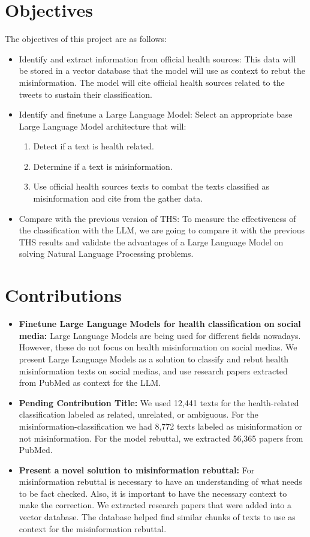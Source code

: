 \section{Objectives}

\noindent
The objectives of this project are as follows:
\begin{itemize}
	\item Identify and extract information from official health sources: This data will be stored in a vector database that the model will use as context to rebut the misinformation. The model will cite official health sources related to the tweets to sustain their classification.
	\item Identify and finetune a Large Language Model: Select an appropriate base Large Language Model architecture that will:
	\begin{enumerate}
		\item Detect if a text is health related.
		\item Determine if a text is misinformation.
		\item Use official health sources texts to combat the texts classified as misinformation and cite from the gather data.
	\end{enumerate}
	\item Compare with the previous version of THS: To measure the effectiveness of the classification with the LLM, we are going to compare it with the previous THS results and validate the advantages of a Large Language Model on solving Natural Language Processing problems. 
\end{itemize}

\section{Contributions}
\noindent
\begin{itemize}
	\item \textbf{Finetune Large Language Models for health classification on social media:} Large Language Models are being used for different fields nowadays. However, these do not focus on health misinformation on social medias. We present Large Language Models as a solution
	to classify and rebut health misinformation texts on social medias, and use research papers extracted from PubMed as context for the LLM.
	\item \textbf{Pending Contribution Title:} We used 12,441 texts for the health-related classification labeled as related, unrelated, or ambiguous. For the misinformation-classification we had 8,772 texts labeled as misinformation or not misinformation. For the model rebuttal, we extracted
	56,365 papers from PubMed.
	\item \textbf{Present a novel solution to misinformation rebuttal:} For misinformation rebuttal is necessary to have an understanding of what needs to be fact checked. Also, it is important to have the necessary context to make the correction. We extracted research papers that were added into a
	vector database. The database helped find similar chunks of texts to use as context for the misinformation rebuttal. 
	
\end{itemize}

